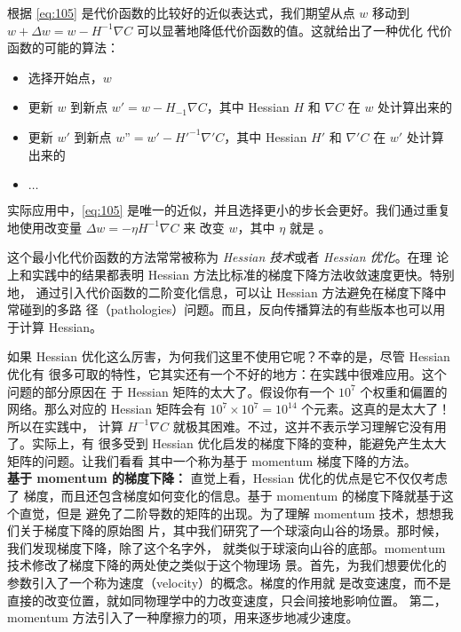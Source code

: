 根据 \eqref{eq:105} 是代价函数的比较好的近似表达式，我们期望从点 $w$ 移动到
$w+\Delta w = w - H^{-1}\nabla C$ 可以显著地降低代价函数的值。这就给出了一种优化
代价函数的可能的算法：
\begin{itemize}
\item 选择开始点，$w$
\item 更新 $w$ 到新点 $w' = w - H_{-1}\nabla C$，其中 Hessian $H$ 和 $\nabla C$
  在 $w$ 处计算出来的
\item 更新 $w'$ 到新点 $w” = w' - H'^{-1}\nabla' C$，其中 Hessian $H'$ 和
  $\nabla' C$ 在 $w'$ 处计算出来的
\item $\ldots$
\end{itemize}

实际应用中，\eqref{eq:105} 是唯一的近似，并且选择更小的步长会更好。我们通过重复
地使用改变量 $\Delta w = -\eta H^{-1} \nabla C$ 来 改变 $w$，其中 $\eta$ 就是
\learningrate{}。

这个最小化代价函数的方法常常被称为 \emph{Hessian 技术}或者 \emph{Hessian 优化}。在理
论上和实践中的结果都表明 Hessian 方法比标准的梯度下降方法收敛速度更快。特别地，
通过引入代价函数的二阶变化信息，可以让 Hessian 方法避免在梯度下降中常碰到的多路
径（pathologies）问题。而且，反向传播算法的有些版本也可以用于计算 Hessian。

如果 Hessian 优化这么厉害，为何我们这里不使用它呢？不幸的是，尽管 Hessian 优化有
很多可取的特性，它其实还有一个不好的地方：在实践中很难应用。这个问题的部分原因在
于 Hessian 矩阵的太大了。假设你有一个 $10^7$ 个权重和偏置的网络。那么对应的
Hessian 矩阵会有 $10^7 \times 10^7=10^14$ 个元素。这真的是太大了！所以在实践中，
计算 $H^{-1}\nabla C$ 就极其困难。不过，这并不表示学习理解它没有用了。实际上，有
很多受到 Hessian 优化启发的梯度下降的变种，能避免产生太大矩阵的问题。让我们看看
其中一个称为基于 momentum 梯度下降的方法。\\

\textbf{基于 momentum 的梯度下降：} 直觉上看，Hessian 优化的优点是它不仅仅考虑了
梯度，而且还包含梯度如何变化的信息。基于 momentum 的梯度下降就基于这个直觉，但是
避免了二阶导数的矩阵的出现。为了理解 momentum 技术，想想我们关于梯度下降的原始图
片，其中我们研究了一个球滚向山谷的场景。那时候，我们发现梯度下降，除了这个名字外，
就类似于球滚向山谷的底部。momentum 技术修改了梯度下降的两处使之类似于这个物理场
景。首先，为我们想要优化的参数引入了一个称为速度（velocity）的概念。梯度的作用就
是改变速度，而不是直接的改变位置，就如同物理学中的力改变速度，只会间接地影响位置。
第二，momentum 方法引入了一种摩擦力的项，用来逐步地减少速度。

